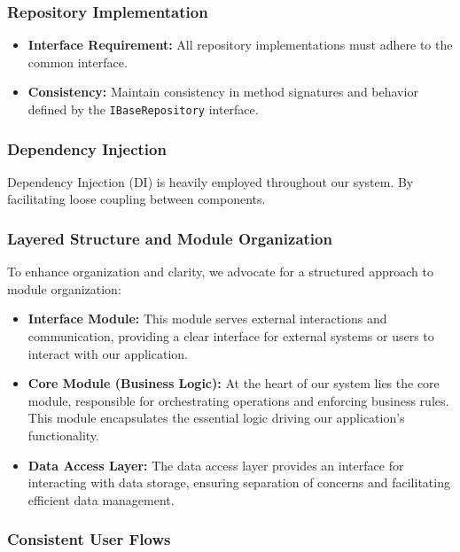 \documentclass{article}
\begin{document}
\subsubsection{Repository Implementation}

\begin{itemize}[label=$\bullet$] \item \textbf{Interface Requirement:} All repository implementations must adhere to the common interface. \item \textbf{Consistency:} Maintain consistency in method signatures and behavior defined by the \texttt{IBaseRepository} interface. \end{itemize}

\subsubsection{Dependency Injection}

Dependency Injection (DI) is heavily employed throughout our system. By facilitating loose coupling between components. 

\subsubsection{ Layered Structure and Module Organization}

To enhance organization and clarity, we advocate for a structured approach to module organization:

\begin{itemize}[label=$\bullet$] \item \textbf{Interface Module:} This module serves external interactions and communication, providing a clear interface for external systems or users to interact with our application.

  \item \textbf{Core Module (Business Logic):} At the heart of our system lies the core module, responsible for orchestrating operations and enforcing business rules. This module encapsulates the essential logic driving our application's functionality.

  \item \textbf{Data Access Layer:} The data access layer provides an interface for interacting with data storage, ensuring separation of concerns and facilitating efficient data management. \end{itemize}

\subsubsection{Consistent User Flows}
\end{document}
